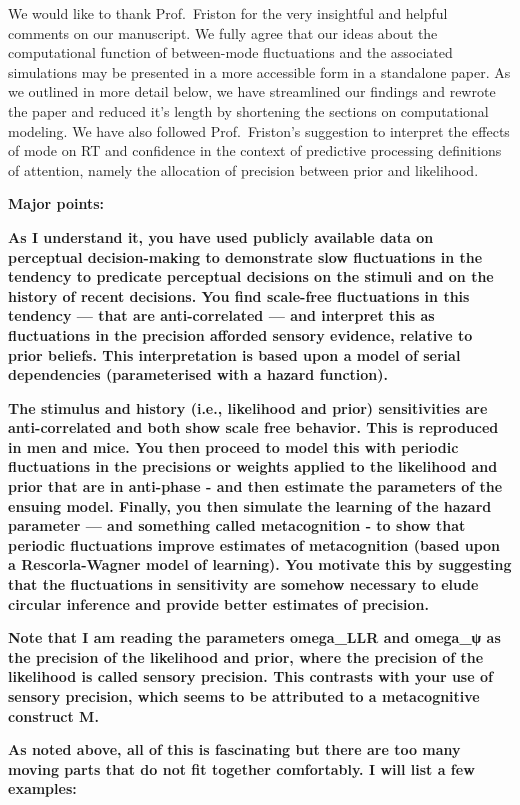 \documentclass[
]{article}
\begin{document}
We would like to thank Prof.~Friston for the very insightful and helpful
comments on our manuscript. We fully agree that our ideas about the
computational function of between-mode fluctuations and the associated
simulations may be presented in a more accessible form in a standalone
paper. As we outlined in more detail below, we have streamlined our
findings and rewrote the paper and reduced it's length by shortening the
sections on computational modeling. We have also followed
Prof.~Friston's suggestion to interpret the effects of mode on RT and
confidence in the context of predictive processing definitions of
attention, namely the allocation of precision between prior and
likelihood.

\textbf{Major points:}

\textbf{As I understand it, you have used publicly available data on
perceptual decision-making to demonstrate slow fluctuations in the
tendency to predicate perceptual decisions on the stimuli and on the
history of recent decisions. You find scale-free fluctuations in this
tendency --- that are anti-correlated --- and interpret this as
fluctuations in the precision afforded sensory evidence, relative to
prior beliefs. This interpretation is based upon a model of serial
dependencies (parameterised with a hazard function).}

\textbf{The stimulus and history (i.e., likelihood and prior)
sensitivities are anti-correlated and both show scale free behavior.
This is reproduced in men and mice. You then proceed to model this with
periodic fluctuations in the precisions or weights applied to the
likelihood and prior that are in anti-phase - and then estimate the
parameters of the ensuing model. Finally, you then simulate the learning
of the hazard parameter --- and something called metacognition - to show
that periodic fluctuations improve estimates of metacognition (based
upon a Rescorla-Wagner model of learning). You motivate this by
suggesting that the fluctuations in sensitivity are somehow necessary to
elude circular inference and provide better estimates of precision.}

\textbf{Note that I am reading the parameters omega\_LLR and omega\_ψ as
the precision of the likelihood and prior, where the precision of the
likelihood is called sensory precision. This contrasts with your use of
sensory precision, which seems to be attributed to a metacognitive
construct M.}

\textbf{As noted above, all of this is fascinating but there are too
many moving parts that do not fit together comfortably. I will list a
few examples:}
\end{document}

